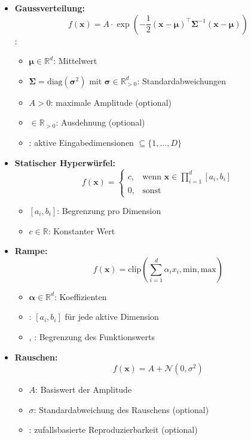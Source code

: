 \begin{otherlanguage}{ngerman}
\begin{itemize}
  \item \textbf{Gaussverteilung:}
    \[
    f(\mathbf{x}) = A \cdot \exp\left(-\frac{1}{2} (\mathbf{x} - \boldsymbol{\mu})^\top \mathbf{\Sigma}^{-1} (\mathbf{x} - \boldsymbol{\mu}) \right)
    \]
    :
    \begin{itemize}
      \item $\boldsymbol{\mu} \in \mathbb{R}^d$: Mittelwert
      \item $\mathbf{\Sigma} = \mathrm{diag}(\boldsymbol{\sigma}^2)$ mit $\boldsymbol{\sigma} \in \mathbb{R}_{>0}^d$: Standardabweichungen
      \item $A > 0$: maximale Amplitude (optional)
      \item {} $\in \mathbb{R}_{>0}$: Ausdehnung (optional)
      \item {}: aktive Eingabedimensionen $\subseteq \{1, \dots, D\}$
    \end{itemize}

  \item \textbf{Statischer Hyperwürfel:}
    \[
    f(\mathbf{x}) =
    \begin{cases}
      c, & \text{wenn } \mathbf{x} \in \prod_{i=1}^d [a_i, b_i] \\
      0, & \text{sonst}
    \end{cases}
    \]
    \begin{itemize}
      \item $[a_i, b_i]$: Begrenzung pro Dimension
      \item $c \in \mathbb{R}$: Konstanter Wert
    \end{itemize}

  \item \textbf{Rampe:}
    \[
    f(\mathbf{x}) = \mathrm{clip}\left( \sum_{i=1}^d \alpha_i x_i, \text{min}, \text{max} \right)
    \]
    \begin{itemize}
      \item $\boldsymbol{\alpha} \in \mathbb{R}^d$: Koeffizienten
      \item {}: $[a_i, b_i]$ für jede aktive Dimension
      \item {}, : Begrenzung des Funktionswerts
    \end{itemize}

  \item \textbf{Rauschen:}
    \[
    f(\mathbf{x}) = A + \mathcal{N}(0, \sigma^2)
    \]
    \begin{itemize}
      \item $A$: Basiswert der Amplitude
      \item $\sigma$: Standardabweichung des Rauschens (optional)
      \item {}: zufallsbasierte Reproduzierbarkeit (optional)
    \end{itemize}


\end{itemize}
\end{otherlanguage}
